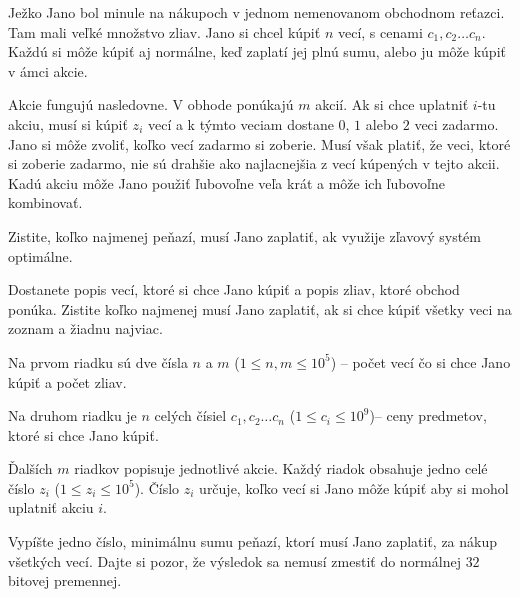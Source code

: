 




Ježko Jano bol minule na nákupoch v jednom nemenovanom obchodnom reťazci. Tam mali veľké množstvo
zliav. Jano si chcel kúpiť $n$ vecí, s cenami $c_1, c_2 \dots c_n$. Každú si môže kúpiť aj normálne,
keď zaplatí jej plnú sumu, alebo ju môže kúpiť v ámci akcie.

Akcie fungujú nasledovne. V obhode ponúkajú $m$ akcií. Ak si chce uplatniť $i$-tu akciu, musí si
kúpiť $z_i$ vecí a k týmto veciam dostane $0$, $1$ alebo $2$ veci zadarmo. Jano si môže zvoliť,
koľko vecí zadarmo si zoberie. Musí však platiť, že veci, ktoré si zoberie zadarmo, nie sú drahšie
ako najlacnejšia z vecí kúpených v tejto akcii. Kadú akciu môže Jano použiť ľubovoľne veľa krát a
môže ich ľubovoľne kombinovať.

Zistite, koľko najmenej peňazí, musí Jano zaplatiť, ak využije zľavový systém optimálne.


Dostanete popis vecí, ktoré si chce Jano kúpiť a popis zliav, ktoré obchod ponúka. Zistite koľko
najmenej musí Jano zaplatiť, ak si chce kúpiť všetky veci na zoznam a žiadnu najviac.


Na prvom riadku sú dve čísla $n$ a $m$ ($1 \leq n, m \leq 10^5$) -- počet vecí čo si chce Jano kúpiť
a počet zliav.

Na druhom riadku je $n$ celých čísiel $c_1, c_2 \dots c_n$ ($1 \leq c_i \leq 10^9$)-- ceny predmetov,
ktoré si chce Jano kúpiť.

Ďalších $m$ riadkov popisuje jednotlivé akcie. Každý riadok obsahuje jedno celé číslo $z_i$ ($1 \leq
z_i \leq 10^5$). Číslo $z_i$ určuje, koľko vecí si Jano môže kúpiť aby si mohol uplatniť akciu $i$.


Vypíšte jedno číslo, minimálnu sumu peňazí, ktorí musí Jano zaplatiť, za nákup všetkých vecí. Dajte
si pozor, že výsledok sa nemusí zmestiť do normálnej $32$ bitovej premennej.


\vstup
\vystup
\koniec


